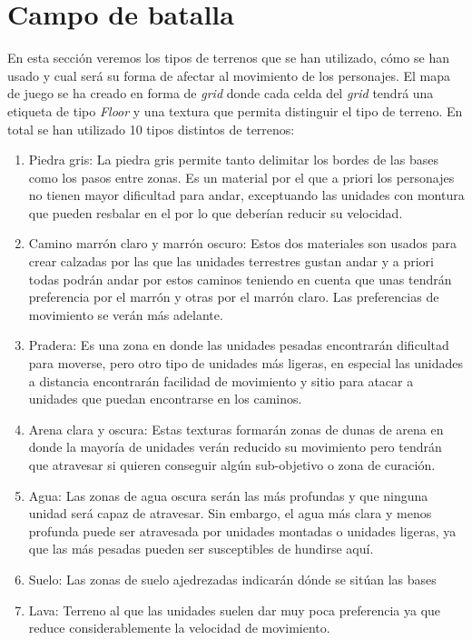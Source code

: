 
\section{Campo de batalla}
En esta sección veremos los tipos de terrenos que se han utilizado, cómo se han usado y cual será su forma de afectar al movimiento de los personajes. El mapa de juego se ha creado en forma de \textit{grid} donde cada celda del \textit{grid} tendrá una etiqueta de tipo \textit{Floor} y una textura que permita distinguir el tipo de terreno. En total se han utilizado 10 tipos distintos de terrenos:
\begin{enumerate}
    \item Piedra gris: La piedra gris permite tanto delimitar los bordes de las bases como los pasos entre zonas. Es un material por el que a priori los personajes no tienen mayor dificultad para andar, exceptuando las unidades con montura que pueden resbalar en el por lo que deberían reducir su velocidad.  
    \item Camino marrón claro y marrón oscuro: Estos dos materiales son usados para crear calzadas por las que las unidades terrestres gustan andar y a priori todas podrán andar por estos caminos teniendo en cuenta que unas tendrán preferencia por el marrón y otras por el marrón claro. Las preferencias de movimiento se verán más adelante.
    \item Pradera: Es una zona en donde las unidades pesadas encontrarán dificultad para moverse, pero otro tipo de unidades más ligeras, en especial las unidades a distancia encontrarán facilidad de movimiento y sitio para atacar a unidades que puedan encontrarse en los caminos.
    \item Arena clara y oscura: Estas texturas formarán zonas de dunas de arena en donde la mayoría de unidades verán reducido su movimiento pero tendrán que atravesar si quieren conseguir algún sub-objetivo o zona de curación. 
    \item Agua: Las zonas de agua oscura serán las más profundas y que ninguna unidad será capaz de atravesar. Sin embargo, el agua más clara y menos profunda puede ser atravesada por unidades montadas o unidades ligeras, ya que las más pesadas pueden ser susceptibles de hundirse aquí.
    \item Suelo: Las zonas de suelo ajedrezadas indicarán dónde se sitúan las bases  
    \item Lava: Terreno al que las unidades suelen dar muy poca preferencia ya que reduce considerablemente la velocidad de movimiento.
\end{enumerate}
